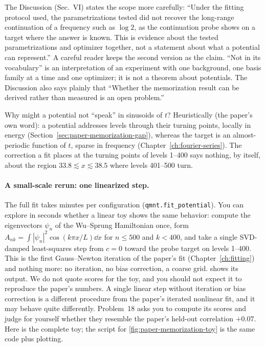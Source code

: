 The Discussion (Sec.~VI) states the scope more carefully: ``Under the fitting protocol used, the parametrizations tested did not recover the long-range continuation of a frequency such as $\log 2$, as the continuation probe shows on a target where the answer is known. This is evidence about the tested parametrizations and optimizer together, not a statement about what a potential can represent.'' A careful reader keeps the second version as the claim. ``Not in its vocabulary'' is an interpretation of an experiment with one background, one basis family at a time and one optimizer; it is not a theorem about potentials. The Discussion also says plainly that ``Whether the memorization result can be derived rather than measured is an open problem.''

Why might a potential not ``speak'' in sinusoids of $t$? Heuristically (the paper's own word): a potential addresses levels through their turning points, locally in energy (Section~\ref{sec:paper-memorization-gap}), whereas the target is an almost-periodic function of $t$, sparse in frequency (Chapter~\ref{ch:fourier-series}). The correction a fit places at the turning points of levels 1--400 says nothing, by itself, about the region $33.8\lesssim x\lesssim38.5$ where levels 401--500 turn.

\paragraph{A small-scale rerun: one linearized step.} The full fit takes minutes per configuration (\texttt{qmnt.fit\_potential}). You can explore in seconds whether a linear toy shows the same behavior: compute the eigenvectors $\psi_n$ of the Wu--Sprung Hamiltonian once, form $A_{nk}=\int|\psi_n|^2\cos(k\pi x/L)\dd x$ for $n\le500$ and $k<400$, and take a single SVD-damped least-squares step from $c=0$ toward the probe target on levels 1--400. This is the first Gauss--Newton iteration of the paper's fit (Chapter~\ref{ch:fitting}) and nothing more: no iteration, no bias correction, a coarse grid.  shows its output. We do not quote scores for the toy, and you should not expect it to reproduce the paper's numbers. A single linear step without iteration or bias correction is a different procedure from the paper's iterated nonlinear fit, and it may behave quite differently. Problem~18 asks you to compute its scores and judge for yourself whether they resemble the paper's held-out correlation $+0.07$. Here is the complete toy; the script for \cref{fig:paper-memorization-toy} is the same code plus plotting.

